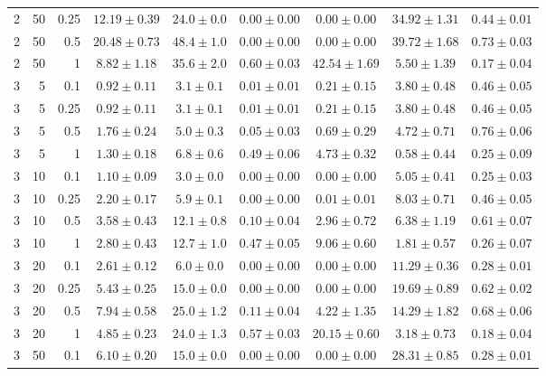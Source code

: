 \begin{table}[htbp]
\begin{tabular}{@{}rrrcccccc@{}}
2 & 50 & 0.25 & $12.19 \pm 0.39$ & $24.0 \pm 0.0$ & $0.00 \pm 0.00$ & $0.00 \pm 0.00$ & $34.92 \pm 1.31$ & $0.44 \pm 0.01$ \\
2 & 50 & 0.5 & $20.48 \pm 0.73$ & $48.4 \pm 1.0$ & $0.00 \pm 0.00$ & $0.00 \pm 0.00$ & $39.72 \pm 1.68$ & $0.73 \pm 0.03$ \\
2 & 50 & 1 & $8.82 \pm 1.18$ & $35.6 \pm 2.0$ & $0.60 \pm 0.03$ & $42.54 \pm 1.69$ & $5.50 \pm 1.39$ & $0.17 \pm 0.04$ \\
\midrule
3 & 5 & 0.1 & $0.92 \pm 0.11$ & $3.1 \pm 0.1$ & $0.01 \pm 0.01$ & $0.21 \pm 0.15$ & $3.80 \pm 0.48$ & $0.46 \pm 0.05$ \\
3 & 5 & 0.25 & $0.92 \pm 0.11$ & $3.1 \pm 0.1$ & $0.01 \pm 0.01$ & $0.21 \pm 0.15$ & $3.80 \pm 0.48$ & $0.46 \pm 0.05$ \\
3 & 5 & 0.5 & $1.76 \pm 0.24$ & $5.0 \pm 0.3$ & $0.05 \pm 0.03$ & $0.69 \pm 0.29$ & $4.72 \pm 0.71$ & $0.76 \pm 0.06$ \\
3 & 5 & 1 & $1.30 \pm 0.18$ & $6.8 \pm 0.6$ & $0.49 \pm 0.06$ & $4.73 \pm 0.32$ & $0.58 \pm 0.44$ & $0.25 \pm 0.09$ \\
3 & 10 & 0.1 & $1.10 \pm 0.09$ & $3.0 \pm 0.0$ & $0.00 \pm 0.00$ & $0.00 \pm 0.00$ & $5.05 \pm 0.41$ & $0.25 \pm 0.03$ \\
3 & 10 & 0.25 & $2.20 \pm 0.17$ & $5.9 \pm 0.1$ & $0.00 \pm 0.00$ & $0.01 \pm 0.01$ & $8.03 \pm 0.71$ & $0.46 \pm 0.05$ \\
3 & 10 & 0.5 & $3.58 \pm 0.43$ & $12.1 \pm 0.8$ & $0.10 \pm 0.04$ & $2.96 \pm 0.72$ & $6.38 \pm 1.19$ & $0.61 \pm 0.07$ \\
3 & 10 & 1 & $2.80 \pm 0.43$ & $12.7 \pm 1.0$ & $0.47 \pm 0.05$ & $9.06 \pm 0.60$ & $1.81 \pm 0.57$ & $0.26 \pm 0.07$ \\
3 & 20 & 0.1 & $2.61 \pm 0.12$ & $6.0 \pm 0.0$ & $0.00 \pm 0.00$ & $0.00 \pm 0.00$ & $11.29 \pm 0.36$ & $0.28 \pm 0.01$ \\
3 & 20 & 0.25 & $5.43 \pm 0.25$ & $15.0 \pm 0.0$ & $0.00 \pm 0.00$ & $0.00 \pm 0.00$ & $19.69 \pm 0.89$ & $0.62 \pm 0.02$ \\
3 & 20 & 0.5 & $7.94 \pm 0.58$ & $25.0 \pm 1.2$ & $0.11 \pm 0.04$ & $4.22 \pm 1.35$ & $14.29 \pm 1.82$ & $0.68 \pm 0.06$ \\
3 & 20 & 1 & $4.85 \pm 0.23$ & $24.0 \pm 1.3$ & $0.57 \pm 0.03$ & $20.15 \pm 0.60$ & $3.18 \pm 0.73$ & $0.18 \pm 0.04$ \\
3 & 50 & 0.1 & $6.10 \pm 0.20$ & $15.0 \pm 0.0$ & $0.00 \pm 0.00$ & $0.00 \pm 0.00$ & $28.31 \pm 0.85$ & $0.28 \pm 0.01$ \\

\end{tabular}
\end{table}
